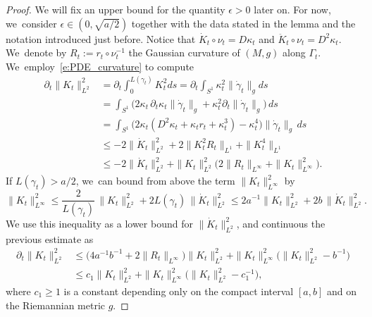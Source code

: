 \begin{proof}
We will fix an upper bound for the quantity $\epsilon>0$ later on. For now, we~consider $\epsilon\in(0,\sqrt{a/2})$ together with the data stated in the lemma and the notation introduced just before. Notice that
$\dot K_t\circ\nu_t = D\kappa_t$ and $\ddot K_t\circ \nu_t=D^2\kappa_t$. We~denote by $R_t:=r_t\circ\nu_t^{-1}$ the Gaussian curvature of $(M,g)$ along $\Gamma_t$. We~employ~\eqref{e:PDE_curvature} to compute
\begin{align*}
\partial_t \|K_t\|_{L^2}^2
&=
\partial_t \int_{0}^{L(\gamma_t)}K_t^2 ds
=
\partial_t \int_{S^1}\kappa_t^2\|\dot\gamma_t\|_g ds\\
&=
\int_{S^1}\Big(2\kappa_t\,\partial_t\kappa_t\|\dot\gamma_t\|_g + \kappa_t^2\partial_t\|\dot\gamma_t\|_g\Big)\,ds\\
&=
\int_{S^1}\Big(2\kappa_t(D^2\kappa_t+\kappa_tr_t+\kappa_t^3)- \kappa_t^4\Big)\|\dot\gamma_t\|_g\,ds\\
&\leq
-2 \|\dot K_t\|_{L^2}^2 + 2 \|K_t^2R_t\|_{L^1} + \|K_t^4\|_{L^1}\\
& \leq
-2 \|\dot K_t\|_{L^2}^2 + \|K_t\|_{L^2}^2\Big(2 \|R_t\|_{L^\infty} + \|K_t\|_{L^\infty}^2 \Big).
\end{align*}
If $L(\gamma_t)>a/2$, we~can bound from above the term $\|K_t\|_{L^\infty}^2$ by
\[
\|K_t\|_{L^\infty}^2
\leq \frac2{L(\gamma_t)}\,\|K_t\|_{L^2}^2 + 2L(\gamma_t)\,\|\dot K_t\|_{L^2}^2
\leq 2a^{-1}\|K_t\|_{L^2}^2 + 2b\,\|\dot K_t\|_{L^2}^2 .
\]
We use this inequality as a lower bound for $\|\dot K_t\|_{L^2}^2$, and continuous the previous estimate as
\begin{equation}\label{e:estimate_Kt_L2_Zoll}
\begin{split}
\!\!\!\! \partial_t \|K_t\|_{L^2}^2
&\leq
\big(4a^{-1}b^{-1} + 2\|R_t\|_{L^\infty}\big) \|K_t\|_{L^2}^2 + \|K_t\|_{L^\infty}^2 \bigl(\|K_t\|_{L^2}^2 - b^{-1}\bigr) \\
&\leq
c_1 \|K_t\|_{L^2}^2 + \|K_t\|_{L^\infty}^2 \big(\|K_t\|_{L^2}^2 - c_1^{-1}\big),
\end{split}
\end{equation}
where $c_1\geq1$ is a constant depending only on the compact interval $[a,b]$ and on the Riemannian metric $g$.


\end{proof}
